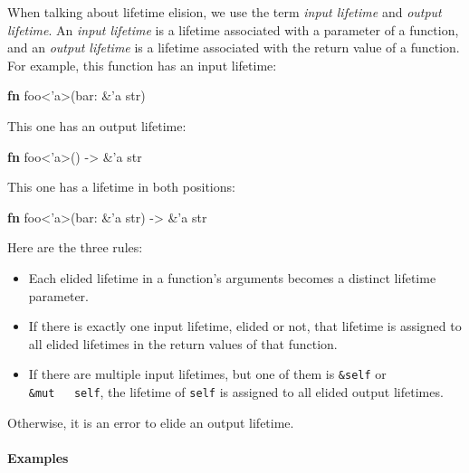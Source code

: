 \documentclass[a4paper,]{book}
\newenvironment{Shaded}{\begin{snugshade}}{\end{snugshade}}
\newcommand{\KeywordTok}[1]{\textcolor[rgb]{0.13,0.29,0.53}{\textbf{{#1}}}}
\newcommand{\DataTypeTok}[1]{\textcolor[rgb]{0.13,0.29,0.53}{{#1}}}
\newcommand{\OtherTok}[1]{\textcolor[rgb]{0.56,0.35,0.01}{{#1}}}
\newcommand{\NormalTok}[1]{{#1}}
\let\oldparagraph\paragraph
\renewcommand{\paragraph}[1]{\oldparagraph{#1}\mbox{}}
\begin{document}
When talking about lifetime elision, we use the term \emph{input
lifetime} and \emph{output lifetime}. An \emph{input lifetime} is a
lifetime associated with a parameter of a function, and an \emph{output
lifetime} is a lifetime associated with the return value of a function.
For example, this function has an input lifetime:

\begin{Shaded}
\begin{Highlighting}[]
\KeywordTok{fn} \NormalTok{foo<}\OtherTok{'a}\NormalTok{>(bar: &}\OtherTok{'a} \DataTypeTok{str}\NormalTok{)}
\end{Highlighting}
\end{Shaded}

This one has an output lifetime:

\begin{Shaded}
\begin{Highlighting}[]
\KeywordTok{fn} \NormalTok{foo<}\OtherTok{'a}\NormalTok{>() -> &}\OtherTok{'a} \DataTypeTok{str}
\end{Highlighting}
\end{Shaded}

This one has a lifetime in both positions:

\begin{Shaded}
\begin{Highlighting}[]
\KeywordTok{fn} \NormalTok{foo<}\OtherTok{'a}\NormalTok{>(bar: &}\OtherTok{'a} \DataTypeTok{str}\NormalTok{) -> &}\OtherTok{'a} \DataTypeTok{str}
\end{Highlighting}
\end{Shaded}

Here are the three rules:

\begin{itemize}
\item
  Each elided lifetime in a function's arguments becomes a distinct
  lifetime parameter.
\item
  If there is exactly one input lifetime, elided or not, that lifetime
  is assigned to all elided lifetimes in the return values of that
  function.
\item
  If there are multiple input lifetimes, but one of them is
  \texttt{\&self} or \texttt{\&mut\ \ \ self}, the lifetime of
  \texttt{self} is assigned to all elided output lifetimes.
\end{itemize}

Otherwise, it is an error to elide an output lifetime.

\paragraph{Examples}\label{examples}
\end{document}
